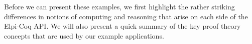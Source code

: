 Before we can present these examples, we first highlight the rather
striking differences in notions of computing and reasoning that arise
on each side of the Elpi-Coq API.   We will also present a quick
summary of the key proof theory concepts that are used by our example
applications.


